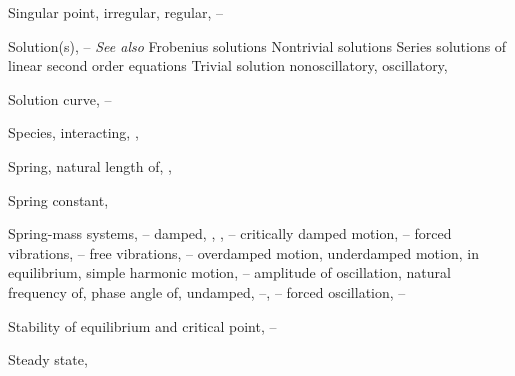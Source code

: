 \begin{theindex}
  \item Singular point, \pageref{eq:7.2.2}
    \subitem irregular, \pageref{thmtype:7.4.1}
    \subitem regular, \pageref{thmtype:7.4.1}--\pageref{exer:7.4.23}

  \item Solution(s), \pageref{example:1.2.1}--\pageref{eq:1.2.10} \emph{See also} Frobenius solutions Nontrivial solutions Series solutions of linear second order equations Trivial solution
    \subitem nonoscillatory, \pageref{exer:7.5.21}
    \subitem oscillatory, \pageref{exer:7.5.21}

  \item Solution curve, \pageref{example:1.2.1}--\pageref{example:1.2.3}

  \item Species, interacting, \pageref{eq:1.1.10}, \pageref{exer:10.4.22}

  \item Spring, natural length of, \pageref{eq:6.1.1}, \pageref{eq:6.1.2}

  \item Spring constant, \pageref{eq:6.1.1}

  \item Spring-mass systems, \pageref{eq:6.1.1}--\pageref{exer:6.2.26}
    \subitem damped, \pageref{eq:4.4.24}, \pageref{eq:6.1.2}, \pageref{exer:6.2.1}--\pageref{exer:6.2.26}
      \subsubitem critically damped motion, \pageref{exer:6.2.1}--\pageref{eq:6.2.11}
      \subsubitem forced vibrations, \pageref{eq:6.2.11}--\pageref{exer:6.2.1}
      \subsubitem free vibrations, \pageref{eq:6.2.11}--\pageref{eq:6.2.15}
      \subsubitem overdamped motion, \pageref{eq:6.2.2}
      \subsubitem underdamped motion, \pageref{eq:6.2.2}
    \subitem in equilibrium, \pageref{eq:6.1.1}
    \subitem simple harmonic motion, \pageref{example:6.1.1}--\pageref{eq:6.1.13}
      \subsubitem amplitude of oscillation, \pageref{example:6.1.2}
      \subsubitem natural frequency of, \pageref{example:6.1.2}
      \subsubitem phase angle of, \pageref{example:6.1.2}
    \subitem undamped, \pageref{eq:4.4.7}--\pageref{eq:4.4.12}, \pageref{example:6.1.1}--\pageref{exer:6.1.1}
      \subsubitem forced oscillation, \pageref{eq:6.1.13}--\pageref{exer:6.2.1}

  \item Stability of equilibrium and critical point, \pageref{eq:4.4.6}--\pageref{eq:4.4.7}

  \item Steady state, \pageref{eq:4.1.12}


\end{theindex}
